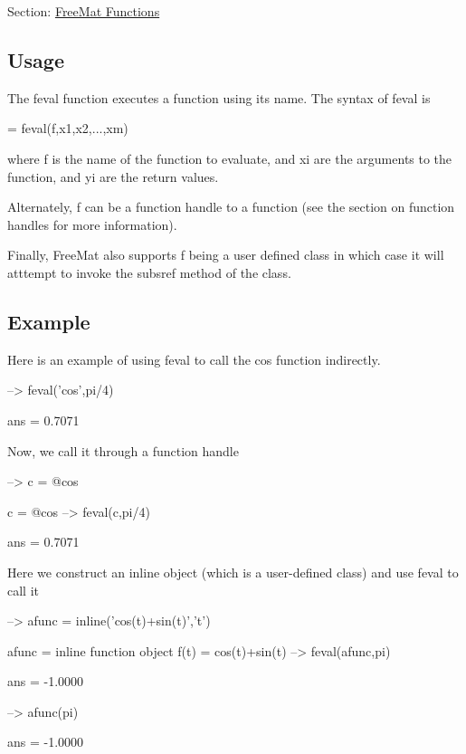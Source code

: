 Section\-: \hyperlink{sec_freemat}{Free\-Mat Functions} \hypertarget{vtkwidgets_vtkxyplotwidget_Usage}{}\subsection{Usage}\label{vtkwidgets_vtkxyplotwidget_Usage}
The {\ttfamily feval} function executes a function using its name. The syntax of {\ttfamily feval} is \begin{DoxyVerb}  [y1,y2,...,yn] = feval(f,x1,x2,...,xm)
\end{DoxyVerb}
 where {\ttfamily f} is the name of the function to evaluate, and {\ttfamily xi} are the arguments to the function, and {\ttfamily yi} are the return values.

Alternately, {\ttfamily f} can be a function handle to a function (see the section on {\ttfamily function handles} for more information).

Finally, Free\-Mat also supports {\ttfamily f} being a user defined class in which case it will atttempt to invoke the {\ttfamily subsref} method of the class. \hypertarget{variables_struct_Example}{}\subsection{Example}\label{variables_struct_Example}
Here is an example of using {\ttfamily feval} to call the {\ttfamily cos} function indirectly.


\begin{DoxyVerbInclude}
--> feval('cos',pi/4)

ans = 
    0.7071 
\end{DoxyVerbInclude}


Now, we call it through a function handle


\begin{DoxyVerbInclude}
--> c = @cos

c = 
 @cos
--> feval(c,pi/4)

ans = 
    0.7071 
\end{DoxyVerbInclude}


Here we construct an inline object (which is a user-\/defined class) and use {\ttfamily feval} to call it


\begin{DoxyVerbInclude}
--> afunc = inline('cos(t)+sin(t)','t')

afunc = 
  inline function object
  f(t) = cos(t)+sin(t)
--> feval(afunc,pi)

ans = 
   -1.0000 

--> afunc(pi)

ans = 
   -1.0000 
\end{DoxyVerbInclude}


